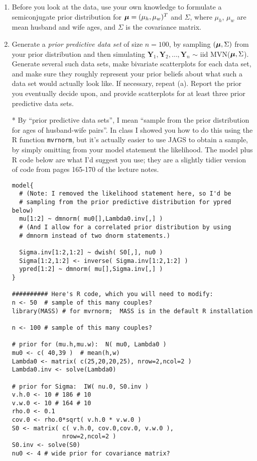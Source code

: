 \documentclass[12pt]{article}
\newcommand{\bfY}{{\mathbf{Y}}}
\newcommand{\bfmu}{\mbox{\boldmath $\mu$}}
\begin{document}
\begin{enumerate}
\item Before you look at the data, use your own knowledge to formulate a 
semiconjugate prior distribution for $\bfmu = (\mu_h,\mu_w)^T$ and
$\Sigma$, where $\mu_h$, $\mu_w$ are mean husband and wife ages,
and $\Sigma$ is the covariance matrix.

\item Generate a {\em{prior predictive data set}} of size $n=100$, by
sampling $(\bfmu,\Sigma)$ from your prior distribution and then
simulating $\bfY_1, \bfY_2,\ldots, \bfY_n$ $\sim$ iid MVN($\bfmu,\Sigma$).
Generate several such data sets, make bivariate scatterplots for each data set,
and make sure they roughly represent your prior beliefs about what such a data set
would actually look like. If necessary, repeat (a). Report the prior you eventually
decide upon, and provide scatterplots for at least three prior predictive data sets.

* By ``prior predictive data sets'', I mean ``sample from the prior distribution
for ages of husband-wife pairs''. In class I showed you how to do this
using the R function \verb+mvrnorm+, but it's actually easier to use JAGS
to obtain a sample, by simply omitting from your model
statement the likelihood. The model plus R code below are what I'd suggest
you use; they are a slightly tidier version of code from pages 165-170
of the lecture notes.

\begin{verbatim}
model{
  # (Note: I removed the likelihood statement here, so I'd be
  # sampling from the prior predictive distribution for ypred below)
  mu[1:2] ~ dmnorm( mu0[],Lambda0.inv[,] )
  # (And I allow for a correlated prior distribution by using
  # dmnorm instead of two dnorm statements.)

  Sigma.inv[1:2,1:2] ~ dwish( S0[,], nu0 )
  Sigma[1:2,1:2] <- inverse( Sigma.inv[1:2,1:2] )
  ypred[1:2] ~ dmnorm( mu[],Sigma.inv[,] )
}

########## Here's R code, which you will need to modify:
n <- 50  # sample of this many couples?
library(MASS) # for mvrnorm;  MASS is in the default R installation

n <- 100 # sample of this many couples?

# prior for (mu.h,mu.w):  N( mu0, Lambda0 )
mu0 <- c( 40,39 )  # mean(h,w)
Lambda0 <- matrix( c(25,20,20,25), nrow=2,ncol=2 )
Lambda0.inv <- solve(Lambda0)

# prior for Sigma:  IW( nu.0, S0.inv )
v.h.0 <- 10 # 186 # 10
v.w.0 <- 10 # 164 # 10
rho.0 <- 0.1
cov.0 <- rho.0*sqrt( v.h.0 * v.w.0 )
S0 <- matrix( c( v.h.0, cov.0,cov.0, v.w.0 ),
              nrow=2,ncol=2 )
S0.inv <- solve(S0)
nu0 <- 4 # wide prior for covariance matrix?


\end{verbatim}
\end{enumerate}
\end{document}
